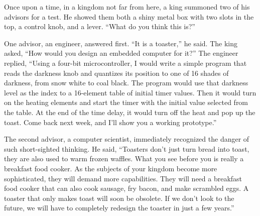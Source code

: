 \begin{bwslide}\small\em
{}

Once upon a time, in a kingdom not far from here, a king summoned two
of his advisors for a test.  He showed them both a shiny metal box
with two slots in the top, a control knob, and a lever.  ``What do you
think this is?''

One advisor, an engineer, answered first. ``It is a toaster,'' he said.
The king asked, ``How would you design an embedded computer for it?''
The engineer replied, ``Using a four-bit microcontroller, I would write
a simple program that reads the darkness knob and quantizes its
position to one of 16 shades of darkness, from snow white to coal
black. The program would use that darkness level as the index to a
16-element table of initial timer values.  Then it would turn on the
heating elements and start the timer with the initial value selected
from the table.  At the end of the time delay, it would turn off the
heat and pop up the toast.  Come back next week, and I'll show you a
working prototype.''

The second advisor, a computer scientist, immediately recognized the danger of
such short-sighted thinking.  He said, ``Toasters don't just turn bread into
toast, they are also used to warm frozen waffles.  What you see before you is
really a breakfast food cooker.  As the subjects of your kingdom become more
sophisticated, they will demand more capabilities.  They will need a breakfast
food cooker that can also cook sausage, fry bacon, and make scrambled eggs.  A
toaster that only makes toast will soon be obsolete.  If we don't look to the
future, we will have to completely redesign the toaster in just a few years.''
\end{bwslide}


